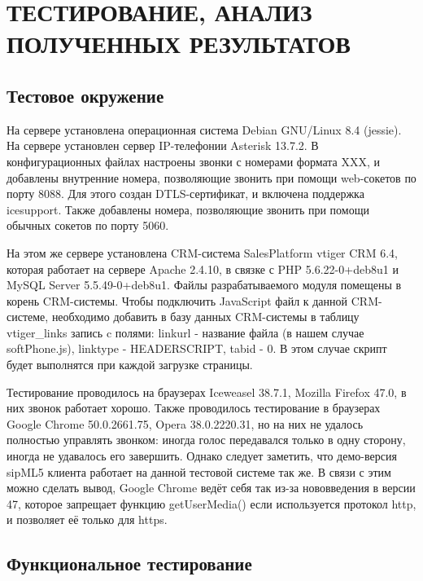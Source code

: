 \chapter{ТЕСТИРОВАНИЕ, АНАЛИЗ ПОЛУЧЕННЫХ РЕЗУЛЬТАТОВ}

\section{Тестовое окружение}

На сервере установлена операционная система Debian GNU/Linux 8.4 (jessie). На сервере установлен сервер IP-телефонии Asterisk 13.7.2. В конфигурационных файлах настроены звонки с номерами формата XXX, и добавлены внутренние номера, позволяющие звонить при помощи web-сокетов по порту 8088. Для этого создан DTLS-сертификат, и включена поддержка icesupport.\cite{asterisk} Также добавлены номера, позволяющие звонить при помощи обычных сокетов по порту 5060.

На этом же сервере установлена CRM-система SalesPlatform vtiger CRM 6.4, которая работает на сервере Apache 2.4.10, в связке с PHP 5.6.22-0+deb8u1 и MySQL Server 5.5.49-0+deb8u1. Файлы разрабатываемого модуля помещены в корень CRM-системы. Чтобы подключить JavaScript файл к данной CRM-системе, необходимо добавить в базу данных CRM-системы в таблицу vtiger\_links запись c полями: linkurl - название файла (в нашем случае softPhone.js), linktype - HEADERSCRIPT, tabid - 0.\cite{vtiger_db} В этом случае скрипт будет выполнятся при каждой загрузке страницы.

Тестирование проводилось на браузерах Iceweasel 38.7.1, Mozilla Firefox 47.0, в них звонок работает хорошо. Также проводилось тестирование в браузерах Google Chrome 50.0.2661.75, Opera 38.0.2220.31, но на них не удалось полностью управлять звонком: иногда голос передавался только в одну сторону, иногда не удавалось его завершить. Однако следует заметить, что демо-версия sipML5 клиента\cite{sipML5_demo} работает на данной тестовой системе так же. В связи с этим можно сделать вывод, Google Chrome ведёт себя так из-за нововведения в версии 47, которое запрещает функцию getUserMedia() если используется протокол http, и позволяет её только для https.\cite{chrome_https}

\section{Функциональное тестирование}

